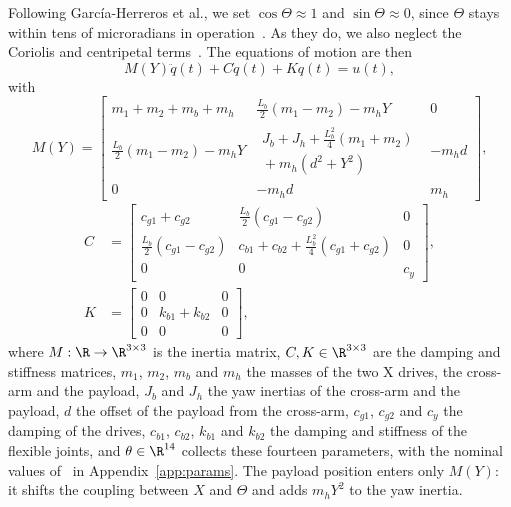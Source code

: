 Following Garc\'ia-Herreros et al., we set $\cos\Theta\approx1$ and
$\sin\Theta\approx0$, since $\Theta$ stays within tens of microradians in
operation~\cite[Sec.~2.3]{garcia2013model}.
As they do, we also neglect the Coriolis and centripetal
terms~\cite[Sec.~2.3]{garcia2013model}.
The equations of motion are then
\begin{equation}
  M(Y)\ddot{q}(t) + C\dot{q}(t) + K q(t) = u(t),
  \label{eq:eom}
\end{equation}
with
{\footnotesize
\setlength{\arraycolsep}{3pt}
\begin{equation}
M(Y)=
\begin{bmatrix}
m_1+m_2+m_b+m_h & \tfrac{L_b}{2}(m_1-m_2)-m_hY & 0\\
\tfrac{L_b}{2}(m_1-m_2)-m_hY &
\substack{J_b+J_h+\tfrac{L_b^2}{4}(m_1+m_2)\\{}+m_h(d^2+Y^2)} & -m_hd\\
0 & -m_hd & m_h
\end{bmatrix},
\label{eq:mass_matrix}
\end{equation}
\begin{equation}
\begin{aligned}
C&=
\begin{bmatrix}
c_{g1}+c_{g2} & \tfrac{L_b}{2}(c_{g1}-c_{g2}) & 0\\
\tfrac{L_b}{2}(c_{g1}-c_{g2}) &
c_{b1}+c_{b2}+\tfrac{L_b^2}{4}(c_{g1}+c_{g2}) & 0\\
0 & 0 & c_y
\end{bmatrix},\\[1ex]
K&=
\begin{bmatrix}
0&0&0\\
0&k_{b1}+k_{b2}&0\\
0&0&0
\end{bmatrix},
\end{aligned}
\label{eq:damping_stiffness_matrices}
\end{equation}
}
where $M:\R\to\R^{3\times3}$ is the inertia matrix,
$C,K\in\R^{3\times3}$ are the damping and stiffness matrices, $m_1$, $m_2$,
$m_b$ and $m_h$ the masses of the two X drives, the cross-arm and the payload,
$J_b$ and $J_h$ the yaw inertias of the cross-arm and the payload, $d$ the
offset of the payload from the cross-arm, $c_{g1}$, $c_{g2}$ and $c_y$ the
damping of the drives, $c_{b1}$, $c_{b2}$, $k_{b1}$ and $k_{b2}$ the damping
and stiffness of the flexible joints, and $\theta\in\R^{14}$ collects these
fourteen parameters, with the nominal values
of~\cite[Table~I]{garcia2013model} in Appendix~\ref{app:params}.
The payload position enters only $M(Y)$: it shifts the coupling between $X$
and $\Theta$ and adds $m_hY^2$ to the yaw inertia.

